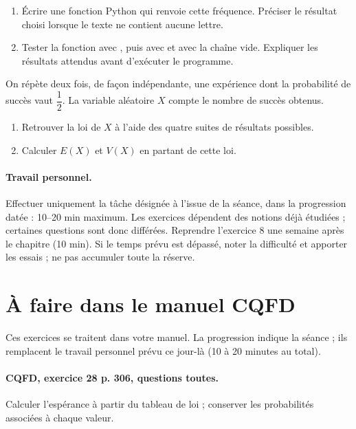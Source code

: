 \begin{enumerate}[label=\arabic*.]
\item Écrire une fonction Python qui renvoie cette fréquence. Préciser le résultat choisi lorsque le texte ne contient aucune lettre.
\item Tester la fonction avec , puis avec  et avec la chaîne vide. Expliquer les résultats attendus avant d’exécuter le programme.
\end{enumerate}
On répète deux fois, de façon indépendante, une expérience dont la probabilité de succès vaut $\dfrac12$. La variable aléatoire $X$ compte le nombre de succès obtenus.
\begin{enumerate}[label=\arabic*.]
\item Retrouver la loi de $X$ à l’aide des quatre suites de résultats possibles.
\item Calculer $E(X)$ et $V(X)$ en partant de cette loi.
\end{enumerate}
\paragraph{Travail personnel.} Effectuer uniquement la tâche désignée à l’issue de la séance, dans la progression datée : 10–20 min maximum. Les exercices dépendent des notions déjà étudiées ; certaines questions sont donc différées. Reprendre l’exercice 8 une semaine après le chapitre (10 min). Si le temps prévu est dépassé, noter la difficulté et apporter les essais ; ne pas accumuler toute la réserve.
\endgroup
{}\section*{À faire dans le manuel CQFD}
Ces exercices se traitent dans votre manuel. La progression indique la séance ; ils remplacent le travail personnel prévu ce jour-là (10 à 20 minutes au total).
\paragraph{CQFD, exercice 28 p. 306, questions toutes.}\label{C08-M1} Calculer l’espérance à partir du tableau de loi ; conserver les probabilités associées à chaque valeur.

